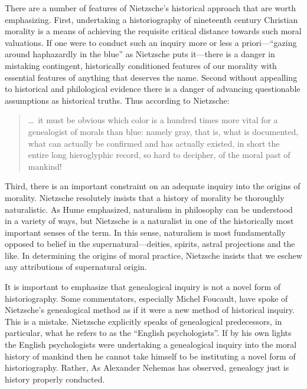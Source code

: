 There are a number of features of Nietzsche's historical approach that are worth emphasizing. First, undertaking a historiography of nineteenth century Christian morality is a means of achieving the requisite critical distance towards such moral valuations. If one were to conduct such an inquiry more or less a priori---``gazing around haphazardly in the blue'' as Nietzsche puts it---there is a danger in mistaking contingent, historically conditioned features of our morality with essential features of anything that deserves the name. Second without appealling to historical and philological evidence there is a danger of advancing questionable assumptions as historical truths. Thus according to Nietzsche:
\begin{quote}
    \ldots\ it must be obvious which color is a hundred times more vital for a genealogist of morals than blue: namely gray, that is, what is documented, what can actually be confirmed and has actually existed, in short the entire long hieroglyphic record, so hard to decipher, of the moral past of mankind!
\end{quote}
Third, there is an important constraint on an adequate inquiry into the origins of morality. Nietzsche resolutely insists that a history of morality be thoroughly naturalistic. As Hume emphasized, naturalism in philosophy can be understood in a variety of ways, but Nietzsche is a naturalist in one of the historically most important senses of the term. In this sense, naturalism is most fundamentally opposed to belief in the supernatural---deities, spirits, astral projections and the like. In determining the origins of moral practice, Nietzsche insists that we eschew any attributions of supernatural origin.

It is important to emphasize that genealogical inquiry is not a novel form of historiography. Some commentators, especially Michel Foucault, have spoke of Nietzsche's genealogical method as if it were a new method of historical inquiry. This is a mistake. Nietzsche explicitly speaks of genealogical predecessors, in particular, what he refers to as the ``English psychologists''. If by his own lights the English psychologists were undertaking a genealogical inquiry into the moral history of mankind then he cannot take himself to be instituting a novel form of historiography. Rather, As Alexander Nehemas has observed, genealogy just is history properly conducted.

